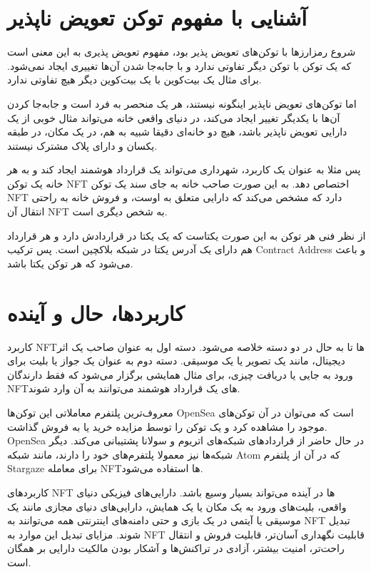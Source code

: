 \section{آشنایی با مفهوم توکن تعویض ناپذیر}
شروع رمزارزها با توکن‌های تعویض پذیر بود، مفهوم تعویض پذیری به این معنی است که یک توکن با توکن دیگر تفاوتی ندارد و با جابه‌جا شدن آن‌ها تغییری ایجاد نمی‌شود. برای مثال یک بیت‌کوین با یک بیت‌کوین دیگر هیچ تفاوتی ندارد.

اما توکن‌های تعویض ناپذیر اینگونه نیستند، هر یک منحصر به فرد است و جابه‌جا کردن آن‌ها با یکدیگر تغییر ایجاد می‌کند،‌ در دنیای واقعی خانه می‌تواند مثال خوبی از یک دارایی تعویض ناپذیر باشد، هیچ دو خانه‌ای دقیقا شبیه به هم، در یک مکان، در طبقه یکسان و دارای پلاک مشترک نیستند.

پس مثلا به عنوان یک کاربرد، شهرداری می‌تواند یک قرارداد هوشمند ایجاد کند و به هر خانه یک توکن NFT اختصاص دهد. به این صورت صاحب خانه به جای سند یک توکن NFT دارد که مشخص می‌کند که دارایی متعلق به اوست، و فروش خانه به راحتی انتقال آن NFT به شخص دیگری است.

از نظر فنی هر توکن به این صورت یکتاست که یک  یکتا در قراردادش دارد و هر قرارداد هم دارای یک آدرس یکتا در شبکه بلاکچین است. پس ترکیب Contract Address و  باعث می‌شود که هر توکن یکتا باشد.


\section{کاربردها، حال و آینده}
کاربرد NFTها تا به حال در دو دسته خلاصه می‌شود. دسته اول به عنوان صاحب یک اثر دیجیتال، مانند یک تصویر یا یک موسیقی. دسته دوم به عنوان یک جواز یا بلیت برای ورود به جایی یا دریافت چیزی، برای مثال همایشی برگزار می‌شود که فقط دارندگان NFTهای یک قرارداد هوشمند می‌توانند به آن وارد شوند.

معروف‌ترین پلتفرم معاملاتی این توکن‌ها OpenSea است که می‌توان در آن توکن‌های موجود را مشاهده کرد و یک توکن را توسط مزایده خرید یا به فروش گذاشت. OpenSea در حال حاضر از قراردادهای شبکه‌های اتریوم و سولانا پشتیبانی می‌کند. دیگر شبکه‌ها نیز معمولا پلتفرم‌های خود را دارند، مانند شبکه Atom که در آن از پلتفرم Stargaze برای معامله NFTها استفاده می‌شود.

کاربردهای NFT ها در آینده می‌تواند بسیار وسیع باشد. دارایی‌های فیزیکی دنیای واقعی، بلیت‌های ورود به یک مکان یا یک همایش، دارایی‌های دنیای مجازی مانند یک موسیقی یا آیتمی در یک بازی و حتی دامنه‌های اینترنتی همه می‌توانند به NFT تبدیل شوند. مزایای تبدیل این موارد به NFT قابلیت نگهداری آسان‌تر، قابلیت فروش و انتقال راحت‌تر، امنیت بیشتر، آزادی در تراکنش‌ها و آشکار بودن مالکیت دارایی بر همگان است.


